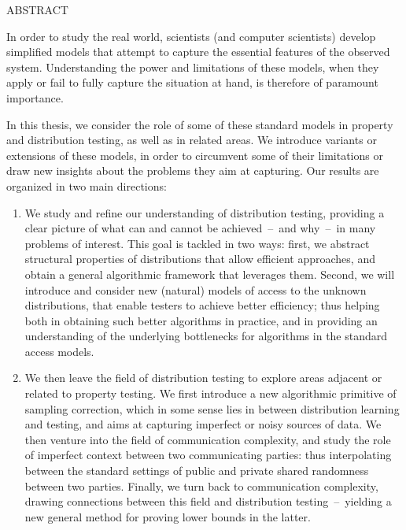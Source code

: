 
\pagestyle{empty} %
\begin{center}
  ABSTRACT

  \@title

  \@author
\end{center}

In order to study the real world, scientists (and computer scientists) develop
simplified models that attempt to capture the essential features of the observed system.
Understanding the power and limitations of these models, when they apply or fail to fully
capture the situation at hand, is therefore of paramount importance.

In this thesis, we consider the role of some of these standard models in property and
distribution testing, as well as in related areas. We introduce variants or extensions of these
models, in order to circumvent some of their limitations or draw new insights about the
problems they aim at capturing. Our results are organized in two main directions:

\begin{enumerate}
  \item We study and refine our understanding of distribution testing, providing a clear picture of what can and cannot be achieved~--~and why~--~in many problems of interest. This goal is tackled in two ways: first, we abstract structural properties of distributions that allow efficient approaches, and obtain a general algorithmic framework that leverages them. Second, we will introduce and consider new (natural) models of access to the unknown distributions, that enable testers to achieve better efficiency; thus helping both in obtaining such better algorithms in practice, and in providing an understanding of the underlying bottlenecks for algorithms in the standard access models.

  \item We then leave the field of distribution testing to explore areas adjacent or related to property testing. We first introduce a new algorithmic primitive of sampling correction, which in some sense lies in between distribution learning and testing, and aims at capturing imperfect or noisy sources of data. We then venture into the field of communication complexity, and study the role of imperfect context between two communicating parties: thus interpolating between the standard settings of public and private shared randomness between two parties. Finally, we turn back to communication complexity, drawing connections between this field and distribution testing~--~yielding a new general method for proving lower bounds in the latter.
\end{enumerate}

